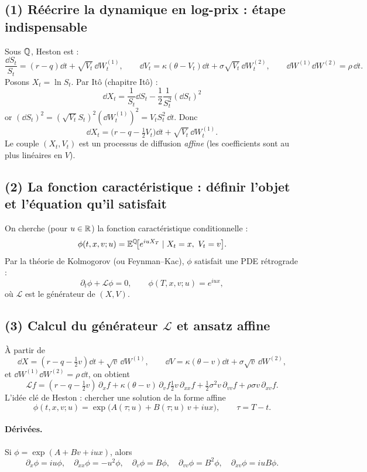 
\subsection*{(1) Réécrire la dynamique en log-prix : étape indispensable}
Sous $\mathbb{Q}$, Heston est :
\[
\frac{\dd S_t}{S_t}=(r-q)\dd t+\sqrt{V_t}\,\dd W_t^{(1)},
\qquad
\dd V_t=\kappa(\theta-V_t)\dd t+\sigma\sqrt{V_t}\,\dd W_t^{(2)},
\qquad
\dd W^{(1)}\dd W^{(2)}=\rho\,\dd t.
\]
Posons $X_t=\ln S_t$. Par Itô (chapitre Itô) :
\[
\dd X_t=\frac{1}{S_t}\dd S_t-\frac12\frac{1}{S_t^2}(\dd S_t)^2
\]
or $(\dd S_t)^2=(\sqrt{V_t}S_t)^2(\dd W_t^{(1)})^2=V_t S_t^2\,\dd t$. Donc
\[
\boxed{\dd X_t=\Big(r-q-\tfrac12 V_t\Big)\dd t+\sqrt{V_t}\,\dd W_t^{(1)}.}
\]
Le couple $(X_t,V_t)$ est un processus de diffusion \emph{affine} (les coefficients sont au plus linéaires en $V$).

\subsection*{(2) La fonction caractéristique : définir l'objet et l'équation qu'il satisfait}
On cherche (pour $u\in\mathbb{R}$) la fonction caractéristique conditionnelle :
\[
\phi(t,x,v;u)=\mathbb{E}^{\mathbb{Q}}\!\big[e^{iuX_T}\mid X_t=x,\ V_t=v\big].
\]
Par la théorie de Kolmogorov (ou Feynman--Kac), $\phi$ satisfait une PDE rétrograde :
\[
\partial_t \phi + \mathcal{L}\phi=0,
\qquad \phi(T,x,v;u)=e^{iux},
\]
où $\mathcal{L}$ est le générateur de $(X,V)$.

\subsection*{(3) Calcul du générateur $\mathcal{L}$ et ansatz affine}
À partir de
\[
\dd X=(r-q-\tfrac12 v)\dd t+\sqrt{v}\,\dd W^{(1)},
\qquad
\dd V=\kappa(\theta-v)\dd t+\sigma\sqrt{v}\,\dd W^{(2)},
\]
et $\dd W^{(1)}\dd W^{(2)}=\rho\,\dd t$, on obtient
\[
\mathcal{L}f
=(r-q-\tfrac12 v)\,\partial_x f+\kappa(\theta-v)\,\partial_v f
\tfrac12 v\,\partial_{xx}f+\tfrac12\sigma^2 v\,\partial_{vv}f+\rho\sigma v\,\partial_{xv}f.
\]
L'idée clé de Heston : chercher une solution de la forme affine
\[
\phi(t,x,v;u)=\exp\big(A(\tau;u)+B(\tau;u)\,v+iux\big),\qquad \tau=T-t.
\]
\paragraph{Dérivées.}
Si $\phi=\exp(A+Bv+iux)$, alors
\[
\partial_x\phi=iu\phi,\quad \partial_{xx}\phi=-u^2\phi,\quad
\partial_v\phi=B\phi,\quad \partial_{vv}\phi=B^2\phi,\quad
\partial_{xv}\phi=iuB\phi.
\]
